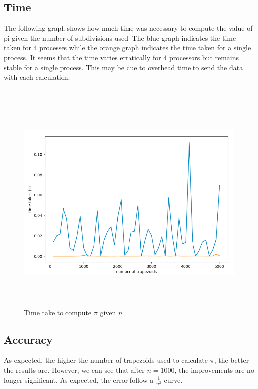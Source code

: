 \documentclass[a4paper]{article}
\begin{document}
\subsection{Time}
The following graph shows how much time was necessary to compute the value of pi given the number of subdivisions used. The blue graph indicates the time taken for 4 processes while the orange graph indicates the time taken for a single process. It seems that the time varies erratically for 4 processors but remains stable for a single process. This may be due to overhead time to send the data with each calculation. 
\\\\
\begin{figure}[h]
\caption{Time take to compute $\pi$ given $n$}
\centering
\includegraphics[width=12cm, height=11cm]{pi_time}
\end{figure}

\newpage
\subsection{Accuracy}
As expected, the higher the number of trapezoids used to calculate $\pi$, the better the results are. However, we can see that after $n=1000$, the improvements are no longer significant. As expected, the error follow a $\frac{1}{n^2}$ curve. 
\\\\
\end{document}
